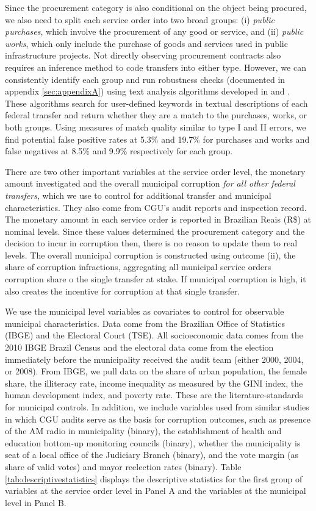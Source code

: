 \documentclass[11pt]{article}
\begin{document}
Since the procurement category is also conditional on the object being procured, we also need to split each service order into two broad groups: (i) \emph{public purchases}, which involve the procurement of any good or service, and (ii) \emph{public works}, which only include the purchase of goods and services used in public infrastructure projects. Not directly observing procurement contracts also requires an inference method to code transfers into either type. However, we can consistently identify each group and run robustness checks (documented in appendix \ref{sec:appendixA}) using text analysis algorithms developed in \citet{GrimmerTextDataPromise2013a} and \citet{AssumpcaotextfindDataDrivenText2018}. These algorithms search for user-defined keywords in textual descriptions of each federal transfer and return whether they are a match to the purchases, works, or both groups. Using measures of match quality similar to type I and II errors, we find potential false positive rates at 5.3\% and 19.7\% for purchases and works and false negatives at 8.5\% and 9.9\% respectively for each group.

There are two other important variables at the service order level, the monetary amount investigated and the overall municipal corruption \emph{for all other federal transfers}, which we use to control for additional transfer and municipal characteristics. They also come from CGU's audit reports and inspection record. The monetary amount in each service order is reported in Brazilian Reais (R\$) at nominal levels. Since these values determined the procurement category and the decision to incur in corruption then, there is no reason to update them to real levels. The overall municipal corruption is constructed using outcome (ii), the share of corruption infractions, aggregating all municipal service orders corruption share   o the single transfer at stake. If municipal corruption is high, it also creates the incentive for corruption at that single transfer.

We use the municipal level variables as covariates to control for observable municipal characteristics. Data come from the Brazilian Office of Statistics (IBGE) and the Electoral Court (TSE). All socioeconomic data comes from the 2010 IBGE Brazil Census and the electoral data come from the election immediately before the municipality received the audit team (either 2000, 2004, or 2008). From IBGE, we pull data on the share of urban population, the female share, the illiteracy rate, income inequality as measured by the GINI index, the human development index, and poverty rate. These are the literature-standards for municipal controls. In addition, we include variables used from similar studies in which CGU audits serve as the basis for corruption outcomes, such as presence of the AM radio in municipality (binary), the establishment of health and education bottom-up monitoring councils (binary), whether the municipality is seat of a local office of the Judiciary Branch (binary), and the vote margin (as share of valid votes) and mayor reelection rates (binary). Table \ref{tab:descriptivestatistics} displays the descriptive statistics for the first group of variables at the service order level in Panel A and the variables at the municipal level in Panel B.
\end{document}
